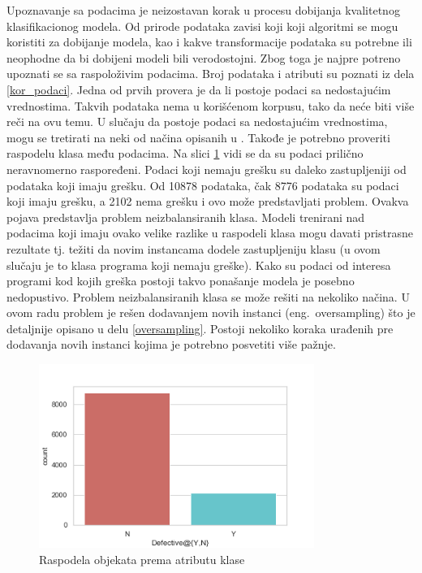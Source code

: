 \documentclass[12pt,oneside]{memoir}
\begin{document}
Upoznavanje sa podacima je neizostavan korak u procesu dobijanja kvalitetnog klasifikacionog modela. Od prirode podataka zavisi koji koji algoritmi se mogu koristiti za dobijanje modela, kao i kakve transformacije podataka su potrebne ili neophodne da bi dobijeni modeli bili verodostojni.
Zbog toga je najpre potreno upoznati se sa raspoloživim podacima. Broj podataka i atributi su poznati iz dela \ref{kor_podaci}. Jedna od prvih provera je da li postoje podaci sa nedostajućim vrednostima. Takvih podataka nema u korišćenom korpusu, tako da neće biti više reči na ovu temu. U slučaju da postoje podaci sa nedostajućim vrednostima, mogu se tretirati na neki od načina opisanih u \cite{mitic}. Takođe je potrebno proveriti raspodelu klasa među podacima. Na slici \ref{fig:raspodela} vidi se da su podaci prilično neravnomerno raspoređeni. Podaci koji nemaju grešku su daleko zastupljeniji od podataka koji imaju grešku. Od 10878 podataka, čak 8776 podataka su podaci koji imaju grešku, a 2102 nema grešku i ovo može predstavljati problem. Ovakva pojava predstavlja problem neizbalansiranih klasa. Modeli trenirani nad podacima koji imaju ovako velike razlike u raspodeli klasa mogu davati pristrasne rezultate tj. težiti da novim instancama dodele zastupljeniju klasu (u ovom slučaju je to klasa programa koji nemaju greške). Kako su podaci od interesa programi kod kojih greška postoji takvo ponašanje modela je posebno nedopustivo. Problem neizbalansiranih klasa se može rešiti na nekoliko načina. U ovom radu problem je rešen dodavanjem novih instanci (eng.~oversampling) što je detaljnije opisano u delu \ref{oversampling}. Postoji nekoliko koraka urađenih pre dodavanja novih instanci kojima je potrebno posvetiti više pažnje.  

\begin{figure}[!ht]
  \centering
  \includegraphics[width=0.80\textwidth]{raspodela.png}
  \caption{Raspodela objekata prema atributu klase}
  \label{fig:raspodela}
\end{figure}
	 
\end{document}

